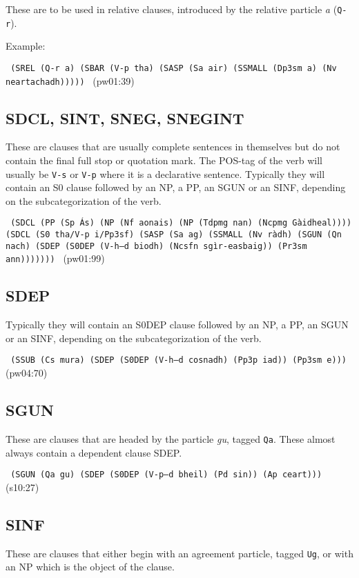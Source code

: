 \documentclass[a4paper]{article}
\begin{document}
These are to be used in relative clauses, introduced by the relative particle \textit{a} (\texttt{Q-r}).

Example:

\texttt{
(SREL (Q-r a) (SBAR (V-p tha) (SASP (Sa air) (SSMALL (Dp3sm a) (Nv neartachadh)))))
} (pw01:39)

\subsection{SDCL, SINT, SNEG, SNEGINT}

These are clauses that are usually complete sentences in themselves but do not contain the final full stop or quotation mark.
The POS-tag of the verb will usually be \texttt{V-s} or \texttt{V-p} where it is a declarative sentence.
Typically they will contain an S0 clause followed by an NP, a PP, an SGUN or an SINF, depending on the subcategorization of the verb.

\texttt{
(SDCL (PP (Sp \'As) (NP (Nf aonais) (NP (Tdpmg nan) (Ncpmg G\`aidheal)))) (SDCL (S0 tha/V-p i/Pp3sf) (SASP (Sa ag) (SSMALL (Nv r\`adh)
(SGUN (Qn nach) (SDEP (S0DEP (V-h--d biodh) (Ncsfn sg\`ir-easbaig)) (Pr3sm ann)))))))
} (pw01:99)

\subsection{SDEP}

Typically they will contain an S0DEP clause followed by an NP, a PP, an SGUN or an SINF, depending on the subcategorization of the verb.

\texttt{
(SSUB (Cs mura) (SDEP (S0DEP (V-h--d cosnadh) (Pp3p iad)) (Pp3sm e)))
} (pw04:70)

\subsection{SGUN}

These are clauses that are headed by the particle \textit{gu}, tagged \texttt{Qa}.
These almost always contain a dependent clause SDEP.

\texttt{
(SGUN (Qa gu) (SDEP (S0DEP (V-p--d bheil) (Pd sin)) (Ap ceart)))
} (s10:27)

\subsection{SINF}

These are clauses that either begin with an agreement particle, tagged \texttt{Ug}, or with an NP which is the object of the clause.
\end{document}

